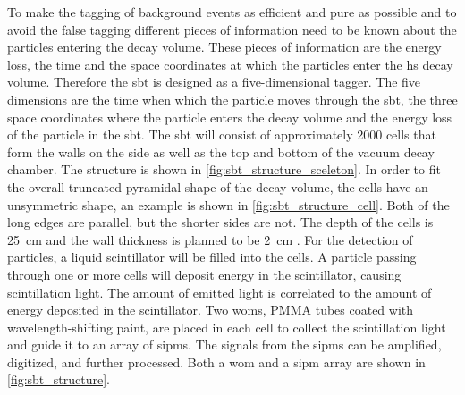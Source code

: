 To make the tagging of background events as efficient and pure as possible and to avoid the false tagging different pieces of information need to be known about the particles entering the decay volume.
These pieces of information are the energy loss, the time and the space coordinates at which the particles enter the \ac{hs} decay volume.
Therefore the \ac{sbt} is designed as a five-dimensional tagger.
The five dimensions are the time when which the particle moves through the \ac{sbt}, the three space coordinates where the particle enters the decay volume and the energy loss of the particle in the \ac{sbt}.
The \ac{sbt} will consist of approximately 2000 cells that form the walls on the side as well as the top and bottom of the vacuum decay chamber.
The structure is shown in \autoref{fig:sbt_structure_sceleton}.
In order to fit the overall truncated pyramidal shape of the decay volume, the cells have an unsymmetric shape, an example is shown in \autoref{fig:sbt_structure_cell}.
Both of the long edges are parallel, but the shorter sides are not.
The depth of the cells is \SI{25}{\centi\meter} and the wall thickness is planned to be \SI{2}{\centi\meter} \cite{}.
For the detection of particles, a liquid scintillator will be filled into the cells.
A particle passing through one or more cells will deposit energy in the scintillator, causing scintillation light.
The amount of emitted light is correlated to the amount of energy deposited in the scintillator.
Two \acp{wom}, PMMA tubes coated with wavelength-shifting paint, are placed in each cell to collect the scintillation light and guide it to an array of \acp{sipm}.
The signals from the \acp{sipm} can be amplified, digitized, and further processed.
Both a \ac{wom} and a \ac{sipm} array are shown in \autoref{fig:sbt_structure}.
